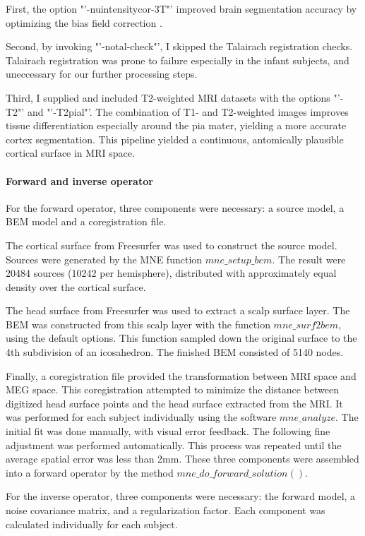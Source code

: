 First, the option "'-nuintensitycor-3T"' improved brain segmentation accuracy by optimizing the bias field correction \cite{3.3.nuintensity}.

Second, by invoking "'-notal-check"', I skipped the Talairach registration checks.
Talairach registration was prone to failure especially in the infant subjects, and uneccessary for our further processing steps.

Third, I supplied and included T2-weighted MRI datasets with the options "'-T2"' and "'-T2pial"'.
The combination of T1- and T2-weighted images improves tissue differentiation especially around the pia mater, yielding a more accurate cortex segmentation.
This pipeline yielded a continuous, antomically plausible cortical surface in MRI space.


\paragraph{Forward and inverse operator}
For the forward operator, three components were necessary: a source model, a BEM model and a coregistration file.

The cortical surface from Freesurfer was used to construct the source model.
Sources were generated by the MNE function $mne\_setup\_bem$.
The result were 20484 sources (10242 per hemisphere), distributed with approximately equal density over the cortical surface.

The head surface from Freesurfer was used to extract a scalp surface layer.
The BEM was constructed from this scalp layer with the function $mne\_surf2bem$, using the default options.
This function sampled down the original surface to the 4th subdivision of an icosahedron.
The finished BEM consisted of 5140 nodes.

Finally, a coregistration file provided the transformation between MRI space and MEG space.
This coregistration attempted to minimize the distance between digitized head surface points and the head surface extracted from the MRI. 
It was performed for each subject individually using the software $mne\_analyze$.
The initial fit was done manually, with visual error feedback.
The following fine adjustment was performed automatically.
This process was repeated until the average spatial error was less than 2mm.
These three components were assembled into a forward operator by the method $mne\_do\_forward\_solution()$.


For the inverse operator, three components were necessary: the forward model, a noise covariance matrix, and a regularization factor.
Each component was calculated individually for each subject.

